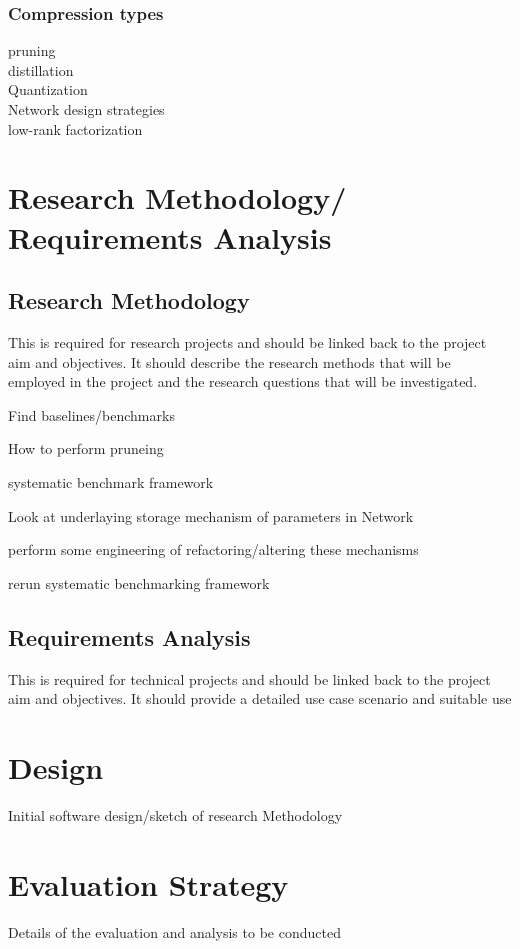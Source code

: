 \documentclass[11pt]{article}
\begin{document}
\subsubsection{Compression types}\label{subsec:compressionTypes}
pruning\\
distillation\\
Quantization\\
Network design strategies\\
low-rank factorization\\

\pagebreak
\section{Research Methodology/ Requirements Analysis}
\subsection{Research Methodology}
This is required for research projects and should be linked
back to the project aim and objectives. It should describe the research methods that
will be employed in the project and the research questions that will be investigated.



Find baselines/benchmarks

How to perform pruneing

systematic benchmark framework

Look at underlaying storage mechanism of parameters in Network

perform some engineering of refactoring/altering these mechanisms


rerun systematic benchmarking framework





\subsection{Requirements Analysis}
This is required for technical projects and should be linked
back to the project aim and objectives. It should provide a detailed use case scenario
and suitable use

\pagebreak
\section{Design}
Initial software design/sketch of research Methodology

\pagebreak
\section{Evaluation Strategy}
Details of the evaluation and analysis to be conducted
\end{document}
